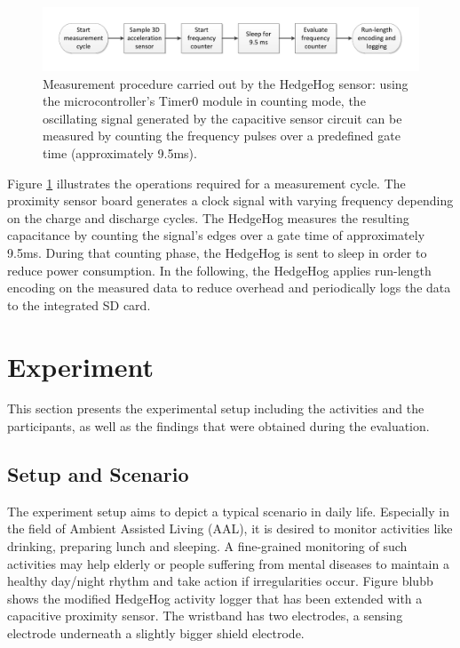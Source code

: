 \documentclass[runningheads,a4paper]{llncs}
\begin{document}
\begin{figure}
	\centering
 		\includegraphics[trim=1cm 1cm 1cm 1cm,clip,width=\textwidth]{Images/pseudocode.pdf}
	\caption{Measurement procedure carried out by the HedgeHog sensor: using the microcontroller's Timer0 module in counting mode, the oscillating signal generated by the capacitive sensor circuit can be measured by counting the frequency pulses over a predefined gate time (approximately 9.5ms).}
	\label{fig:pseudocode}
\end{figure}

Figure \ref{fig:pseudocode} illustrates the operations required for a measurement cycle. The proximity sensor board generates a clock signal with varying frequency depending on the charge and discharge cycles. The HedgeHog measures the resulting capacitance by counting the signal's edges over a gate time of approximately 9.5ms. During that counting phase, the HedgeHog is sent to sleep in order to reduce power consumption. In the following, the HedgeHog applies run-length encoding on the measured data to reduce overhead and periodically logs the data to the integrated SD card.

\section{Experiment}
\label{sect:experiment}

This section presents the experimental setup including the activities and the participants, as well as the findings that were obtained during the evaluation.

\subsection{Setup and Scenario}

The experiment setup aims to depict a typical scenario in daily life. Especially in the field of Ambient Assisted Living (AAL), it is desired to monitor activities like drinking, preparing lunch and sleeping. A fine-grained monitoring of such activities may help elderly or people suffering from mental diseases to maintain a healthy day/night rhythm and take action if irregularities occur. Figure blubb shows the modified HedgeHog activity logger that has been extended with a capacitive proximity sensor. The wristband has two electrodes, a sensing electrode underneath a slightly bigger shield electrode. 
\end{document}
